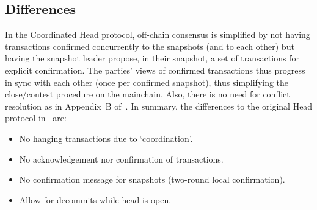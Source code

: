 \subsection{Differences}
In the Coordinated Head protocol, off-chain consensus is simplified by not
having transactions confirmed concurrently to the snapshots (and to each other)
but having the snapshot leader propose, in their snapshot, a set of transactions
for explicit confirmation. The parties' views of confirmed transactions thus
progress in sync with each other (once per confirmed snapshot), thus simplifying
the close/contest procedure on the mainchain. Also, there is no need for
conflict resolution as in Appendix~B of~\cite{hydrahead20}. In summary, the
differences to the original Head protocol in~\cite{hydrahead20} are:

\begin{itemize}
	\item No hanging transactions due to `coordination'.
	\item No acknowledgement nor confirmation of transactions.
	\item No confirmation message for snapshots (two-round local confirmation).
	\item Allow for  decommits while head is open.
\end{itemize}

